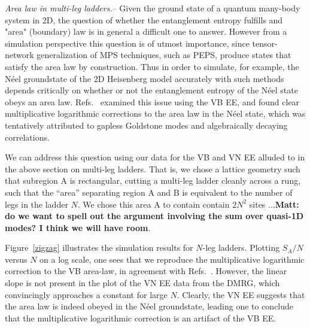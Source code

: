 \documentclass[prl,aps,twocolumn,floatfix,amsmath,amssymb,superscriptaddress,tightenlines]{revtex4}
\begin{document}
{\it Area law in multi-leg ladders.}--  Given the ground state of a
quantum many-body system in 2D, the question of whether the entanglement
entropy fulfills and "area" (boundary) law is in general a difficult one
to answer.  However from a simulation perspective this question is of
utmost importance, since tensor-network generalization of MPS techniques,
such as PEPS, produce states that satisfy the area law by construction.
Thus in order to simulate, for example, the N\'eel groundstate of the 2D
Heisenberg model accurately with such methods depends critically on
whether or not the entanglement entropy of the N\'eel state obeys an area
law.  Refs.~\cite{Alet,Chh} examined this issue using the VB EE, and found
clear multiplicative logarithmic corrections to the area law in the N\'eel
state, which was tentatively attributed to gapless Goldstone modes and
algebraically decaying correlations.  

We can address this question using our data for the VB and VN EE alluded
to in the above section on multi-leg ladders.  That is, we chose a lattice
geometry such that subregion A is rectangular, cutting a multi-leg ladder
cleanly across a rung, such that the ``area'' separating region A and B is
equivalent to the number of legs in the ladder $N$.  We chose this area A
to contain contain $2N^2$ sites ...{\bf Matt: do we want to spell out the
argument involving the sum over quasi-1D modes?  I think we will have
room}.

Figure~\ref{zigzag} illustrates the simulation results for $N$-leg ladders.
Plotting $S_A/N$ versus $N$ on a log scale, one sees that we reproduce the
multiplicative logarithmic correction to the VB area-law, in agreement
with Refs.~\cite{Alet,Chh}.  However, the linear slope is not present in
the plot of the VN EE data from the DMRG, which convincingly approaches a
constant for large $N$.  Clearly, the VN EE suggests that the area law is
indeed obeyed in the N\'eel groundstate, leading one to conclude that the
multiplicative logarithmic correction is an artifact of the VB EE.

\end{document}
